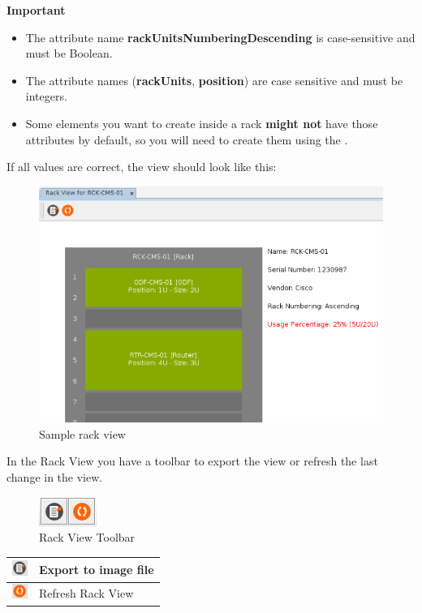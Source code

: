\documentclass[a4paper]{article}
\begin{document}
		\begin{framed} {\large \textbf{Important}}
			\begin{itemize}
				\item The attribute name \textbf{rackUnitsNumberingDescending} is case-sensitive and must be Boolean.
				\item The attribute names (\textbf{rackUnits}, \textbf{position}) are case sensitive and must be integers.
				\item Some elements you want to create inside a rack \textbf{might not} have those attributes by default, so you will need to create them using the .			
			\end{itemize}
		\end{framed}
		\newpage		
		If all values are correct, the view should look like this:
		\begin{figure}[h!]
			\centering
			\includegraphics[width=0.7\linewidth]{img/rack_view_sample_view.png}
			\caption{Sample rack view}
			\label{fig:rack_view_sample_view}
		\end{figure}

		In the Rack View you have a toolbar to export the view or refresh the last change in the view.
		
		\begin{figure}[h!]
			\centering
			\includegraphics[width=0.1\linewidth]{img/rack_view_toolbar.png}
			\caption{Rack View Toolbar}
			\label{fig:rack_view_toolbar}
		\end{figure}
		
		\begin{table}[h!]
			\centering
			\begin{tabular}[h!]{lp{10cm}}
				\includegraphics[width=0.5cm]{img/icon_export.png} & Export to image file\\
				\midrule
				\includegraphics[width=0.5cm]{img/icon_refresh_view.png} & Refresh Rack View\\
				\midrule
			\end{tabular}
		\end{table}
		
\end{document}
